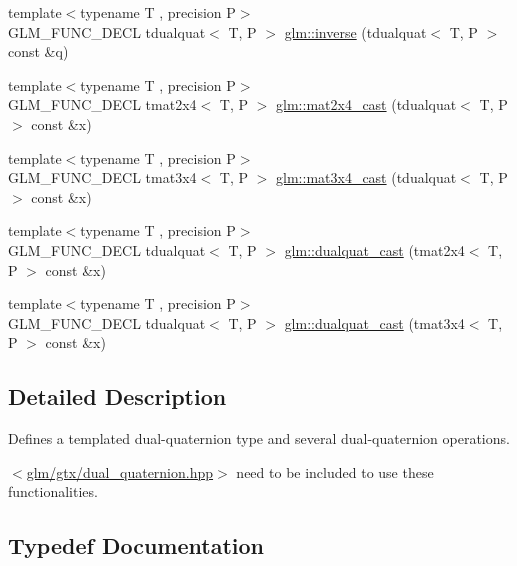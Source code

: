 \begin{DoxyCompactItemize}
\item 
{\footnotesize template$<$typename T , precision P$>$ }\\G\+L\+M\+\_\+\+F\+U\+N\+C\+\_\+\+D\+E\+C\+L tdualquat$<$ T, P $>$ \hyperlink{group__gtx__dual__quaternion_ga2149d3cb8af04d9530de0cd16aa1aab2}{glm\+::inverse} (tdualquat$<$ T, P $>$ const \&q)
\item 
{\footnotesize template$<$typename T , precision P$>$ }\\G\+L\+M\+\_\+\+F\+U\+N\+C\+\_\+\+D\+E\+C\+L tmat2x4$<$ T, P $>$ \hyperlink{group__gtx__dual__quaternion_ga2d124748183e12db8288eeaca350298e}{glm\+::mat2x4\+\_\+cast} (tdualquat$<$ T, P $>$ const \&x)
\item 
{\footnotesize template$<$typename T , precision P$>$ }\\G\+L\+M\+\_\+\+F\+U\+N\+C\+\_\+\+D\+E\+C\+L tmat3x4$<$ T, P $>$ \hyperlink{group__gtx__dual__quaternion_ga576745d979e3c079a64152490c816954}{glm\+::mat3x4\+\_\+cast} (tdualquat$<$ T, P $>$ const \&x)
\item 
{\footnotesize template$<$typename T , precision P$>$ }\\G\+L\+M\+\_\+\+F\+U\+N\+C\+\_\+\+D\+E\+C\+L tdualquat$<$ T, P $>$ \hyperlink{group__gtx__dual__quaternion_gada9799afe2b62394dc498534beb5bc78}{glm\+::dualquat\+\_\+cast} (tmat2x4$<$ T, P $>$ const \&x)
\item 
{\footnotesize template$<$typename T , precision P$>$ }\\G\+L\+M\+\_\+\+F\+U\+N\+C\+\_\+\+D\+E\+C\+L tdualquat$<$ T, P $>$ \hyperlink{group__gtx__dual__quaternion_ga20eb5758beb73cc6dbc2d9104f03ec20}{glm\+::dualquat\+\_\+cast} (tmat3x4$<$ T, P $>$ const \&x)
\end{DoxyCompactItemize}


\subsection{Detailed Description}
Defines a templated dual-\/quaternion type and several dual-\/quaternion operations. 

$<$\hyperlink{dual__quaternion_8hpp}{glm/gtx/dual\+\_\+quaternion.\+hpp}$>$ need to be included to use these functionalities. 

\subsection{Typedef Documentation}
\hypertarget{group__gtx__dual__quaternion_ga373431ffdd82d5c03c258217a9e1f1a6}{}
